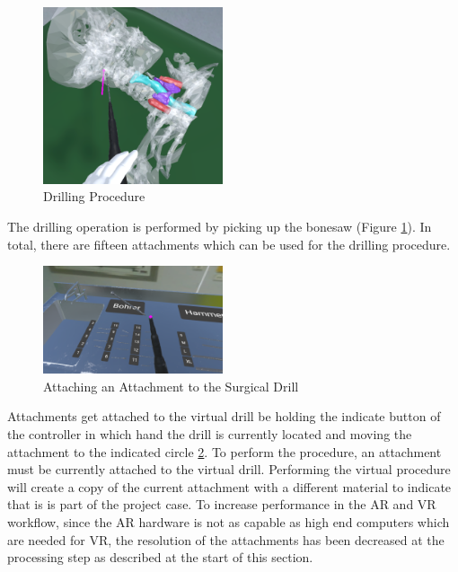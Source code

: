 \begin{figure}[ht]
    \centering
    \includegraphics[width=200px]{images/implementation/features/procedures/drilling.png}
    \caption{\label{fig::FeatureDrilling} Drilling Procedure}
\end{figure}

The drilling operation is performed by picking up the bonesaw (Figure \ref{fig::FeatureDrilling}).
In total, there are fifteen attachments which can be used for the drilling procedure.

\begin{figure}[ht]
    \centering
    \includegraphics[width=200px]{images/implementation/features/procedures/drilling_attachment.png}
    \caption{\label{fig::FeatureDrillingAttachments} Attaching an Attachment to the Surgical Drill}
\end{figure}

Attachments get attached to the virtual drill be holding the indicate button of the controller in which hand the drill is currently located and moving the attachment to the indicated circle \ref{fig::FeatureDrillingAttachments}.
To perform the procedure, an attachment must be currently attached to the virtual drill.
Performing the virtual procedure will create a copy of the current attachment with a different material to indicate that is is part of the project case.
To increase performance in the AR and VR workflow, since the AR hardware is not as capable as high end computers which are needed for VR, the resolution of the attachments has been decreased at the processing step as described at the start of this section.